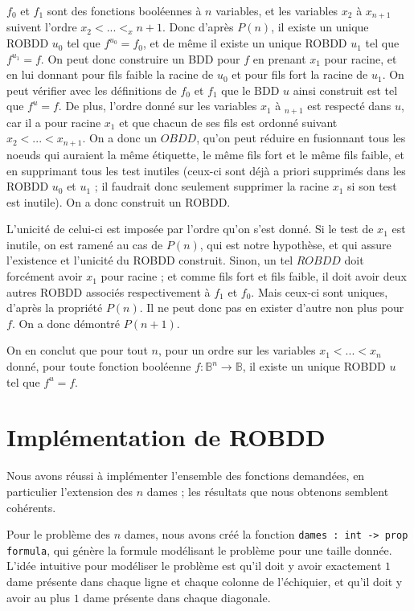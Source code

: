 \documentclass[a4paper,11pt]{article}
\begin{document}
\begin{itemize}
		$f_0$ et $f_1$ sont des fonctions booléennes à $n$ variables, et  les variables $x_2$ à $x_{n+1}$ suivent l'ordre $x_2 < ... < _ x{n+1}$. Donc d'après $P(n)$, il existe un unique ROBDD $u_0$ tel que $f^{u_0} = f_0$, et de même il existe un unique ROBDD $u_1$ tel que $f^{u_1} = f$.
		On peut donc construire un BDD pour $f$ en prenant $x_1$ pour racine, et en lui donnant pour fils faible la racine de $u_0$ et pour fils fort la racine de $u_1$. On peut vérifier avec les définitions de $f_0$ et $f_1$ que le BDD $u$ ainsi construit est tel que $f^u = f$. De plus, l'ordre donné sur les variables $x_1$ à $_{n+1}$ est respecté dans $u$, car il a pour racine $x_1$ et que chacun de ses fils est ordonné suivant $x_2 < ... < x_{n+1}$. On a donc un $OBDD$, qu'on peut réduire en fusionnant tous les noeuds qui auraient la même étiquette, le même fils fort et le même fils faible, et en supprimant tous les test inutiles (ceux-ci sont déjà a priori supprimés dans les ROBDD $u_0$ et $u_1$ ; il faudrait donc seulement supprimer la racine $x_1$ si son test est inutile). On a donc construit un ROBDD. 

L'unicité de celui-ci est imposée par l'ordre qu'on s'est donné. Si le test de $x_1$ est inutile, on est ramené au cas de $P(n)$, qui est notre hypothèse, et qui assure l'existence et l'unicité du ROBDD construit. Sinon, un tel $ROBDD$ doit forcément avoir $x_1$ pour racine ; et comme fils fort et fils faible, il doit avoir deux autres ROBDD associés respectivement à $f_1$ et $f_0$. Mais ceux-ci sont uniques, d'après la propriété $P(n)$. Il ne peut donc pas en exister d'autre non plus pour $f$. On a donc démontré $P(n+1)$.
		\end{itemize}
		
On en conclut que pour tout $n$, pour un ordre sur les variables $x_1 < ... < x_n$ donné, pour toute fonction booléenne $f : \mathbb{B}^n \rightarrow \mathbb{B}$, il existe un unique ROBDD $u$ tel que $f^u = f$.
		
	\section{Implémentation de ROBDD}
	
	Nous avons réussi à implémenter l'ensemble des fonctions demandées, en particulier l'extension des $n$ dames ; les résultats que nous obtenons semblent cohérents.
	
	Pour le problème des $n$ dames, nous avons créé la fonction \texttt{dames : int -> prop formula}, qui génère la formule modélisant le problème pour une taille donnée. L'idée intuitive pour modéliser le problème est qu'il doit y avoir exactement $1$ dame présente dans chaque ligne et chaque colonne de l'échiquier, et qu'il doit y avoir au plus $1$ dame présente dans chaque diagonale. 
	
\end{document}
